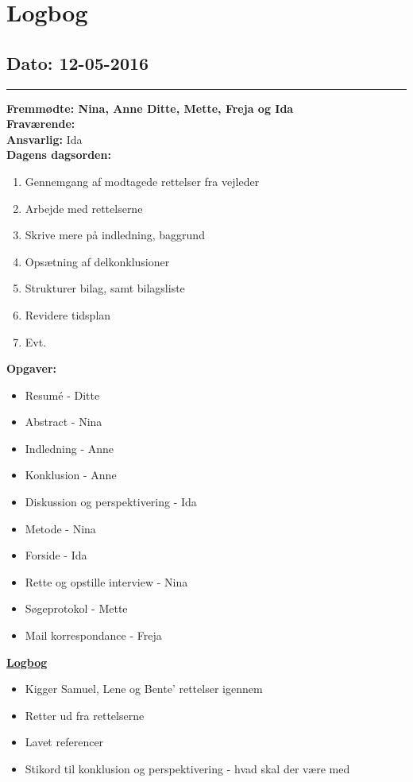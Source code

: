 \chapter{Logbog}
\section{Dato: 12-05-2016}
\hrule
\textbf{Fremmødte: Nina, Anne Ditte, Mette, Freja og Ida} \\
\textbf{Fraværende: } \\
\textbf{Ansvarlig: } Ida  \\
\textbf{Dagens dagsorden: }
\begin{enumerate}
\item Gennemgang af modtagede rettelser fra vejleder
\item Arbejde med rettelserne
\item Skrive mere på indledning, baggrund
\item Opsætning af delkonklusioner
\item Strukturer bilag, samt bilagsliste
\item Revidere tidsplan
\item Evt. 
\end{enumerate}
\textbf{Opgaver: }
\begin{itemize}
\item Resumé - Ditte
\item Abstract - Nina
\item Indledning - Anne
\item Konklusion - Anne
\item Diskussion og perspektivering - Ida
\item Metode - Nina
\item Forside - Ida
\item Rette og opstille interview - Nina
\item Søgeprotokol - Mette
\item Mail korrespondance - Freja
\end{itemize}
\underline{\textbf{Logbog}}\\
\begin{itemize}
\item Kigger Samuel, Lene og Bente' rettelser igennem
\item Retter ud fra rettelserne
\item Lavet referencer
\item Stikord til konklusion og perspektivering - hvad skal der være med
\end{itemize}